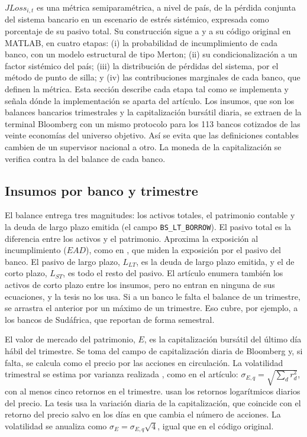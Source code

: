 $JLoss_{i,t}$ es una métrica semiparamétrica, a nivel de país, de la pérdida conjunta del sistema bancario en un escenario de estrés sistémico, expresada como porcentaje de su pasivo total. Su construcción sigue a \citet{Chari2024b} y a su código original en MATLAB, en cuatro etapas: (i) la probabilidad de incumplimiento de cada banco, con un modelo estructural de tipo Merton; (ii) su condicionalización a un factor sistémico del país; (iii) la distribución de pérdidas del sistema, por el método de punto de silla; y (iv) las contribuciones marginales de cada banco, que definen la métrica. Esta sección describe cada etapa tal como se implementa y señala dónde la implementación se aparta del artículo. Los insumos, que son los balances bancarios trimestrales y la capitalización bursátil diaria, se extraen de la terminal Bloomberg con un mismo protocolo para los 113 bancos cotizados de las veinte economías del universo objetivo. Así se evita que las definiciones contables cambien de un supervisor nacional a otro. La moneda de la capitalización se verifica contra la del balance de cada banco.

\subsection{Insumos por banco y trimestre}
\label{sec:jloss-insumos}

El balance entrega tres magnitudes: los activos totales, el patrimonio contable y la deuda de largo plazo emitida (el campo \texttt{BS\_LT\_BORROW}). El pasivo total es la diferencia entre los activos y el patrimonio. Aproxima la exposición al incumplimiento ($EAD$), como en \citet{Chari2024b}, que miden la exposición por el pasivo del banco. El pasivo de largo plazo, $L_{LT}$, es la deuda de largo plazo emitida, y el de corto plazo, $L_{ST}$, es todo el resto del pasivo. El artículo enumera también los activos de corto plazo entre los insumos, pero no entran en ninguna de sus ecuaciones, y la tesis no los usa. Si a un banco le falta el balance de un trimestre, se arrastra el anterior por un máximo de un trimestre. Eso cubre, por ejemplo, a los bancos de Sudáfrica, que reportan de forma semestral.

El valor de mercado del patrimonio, $E$, es la capitalización bursátil del último día hábil del trimestre. Se toma del campo de capitalización diaria de Bloomberg y, si falta, se calcula como el precio por las acciones en circulación. La volatilidad trimestral se estima por varianza realizada \citep{BarndorffNielsenShephard2002}, como en el artículo: $\sigma_{E,q}=\sqrt{\sum_d r_d^2}$, con al menos cinco retornos en el trimestre. \citet{Chari2024b} usan los retornos logarítmicos diarios del precio. La tesis usa la variación diaria de la capitalización, que coincide con el retorno del precio salvo en los días en que cambia el número de acciones. La volatilidad se anualiza como $\sigma_E=\sigma_{E,q}\sqrt4$, igual que en el código original.

